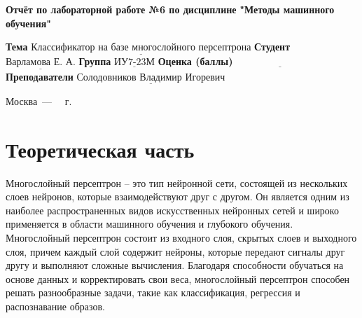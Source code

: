 \documentclass[12pt]{report}
\begin{document}
\begin{titlepage}
	
	\begin{center}
		\noindent\begin{minipage}{1.3\textwidth}\centering
			\Large\textbf{  Отчёт по лабораторной работе №6 по дисциплине}\newline
			\textbf{ "Методы машинного обучения"}\newline\newline
		\end{minipage}
	\end{center}
	
	\noindent\textbf{Тема} $\underline{\text{Классификатор на базе многослойного персептрона}}$\newline\newline
	\noindent\textbf{Студент} $\underline{\text{Варламова Е. А.}}$\newline\newline
	\noindent\textbf{Группа} $\underline{\text{ИУ7-23М}}$\newline\newline
	\noindent\textbf{Оценка (баллы)} $\underline{\text{~~~~~~~~~~~~~~~~~~~~~~~~~~~}}$\newline\newline
	\noindent\textbf{Преподаватели} $\underline{\text{Солодовников Владимир Игоревич}}$\newline\newline\newline
	
	\begin{center}
		\vfill
		Москва~---~\the\year
		~г.
	\end{center}
\end{titlepage}
\large
\setcounter{page}{2}
\def\contentsname{СОДЕРЖАНИЕ}
\renewcommand{\contentsname}{СОДЕРЖАНИЕ}
\tableofcontents
\renewcommand\labelitemi{---}
\newpage
\chapter{Теоретическая часть}

Многослойный персептрон -- это тип нейронной сети, состоящей из нескольких слоев нейронов, которые взаимодействуют друг с другом. Он является одним из наиболее распространенных видов искусственных нейронных сетей и широко применяется в области машинного обучения и глубокого обучения. Многослойный персептрон состоит из входного слоя, скрытых слоев и выходного слоя, причем каждый слой содержит нейроны, которые передают сигналы друг другу и выполняют сложные вычисления. Благодаря способности обучаться на основе данных и корректировать свои веса, многослойный персептрон способен решать разнообразные задачи, такие как классификация, регрессия и распознавание образов.
\end{document}
